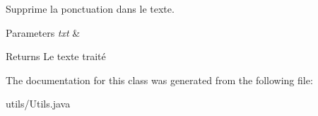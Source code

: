 Supprime la ponctuation dans le texte. 


\begin{DoxyParams}{Parameters}
{\em txt} & \\
\hline
\end{DoxyParams}
\begin{DoxyReturn}{Returns}
Le texte traité 
\end{DoxyReturn}


The documentation for this class was generated from the following file\+:\begin{DoxyCompactItemize}
\item 
utils/Utils.\+java\end{DoxyCompactItemize}
